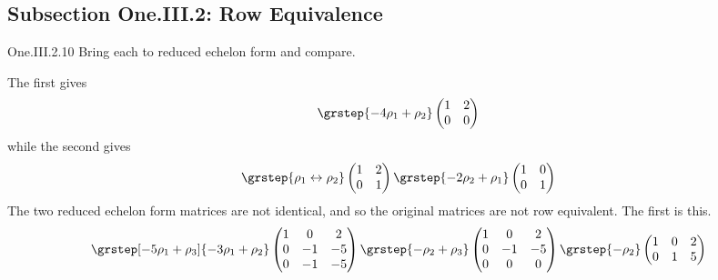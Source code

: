 \subsection{Subsection One.III.2: Row Equivalence}
\begin{ans}{One.III.2.10}
      Bring each to reduced echelon form and compare.
      \begin{exparts}
        \partsitem The first gives
          \begin{equation*}
            \grstep{-4\rho_1+\rho_2}
            \begin{pmatrix}
              1  &2  \\
              0  &0
            \end{pmatrix}
          \end{equation*}
          while the second gives
          \begin{equation*}
            \grstep{\rho_1\leftrightarrow\rho_2}
            \begin{pmatrix}
              1  &2  \\
              0  &1
            \end{pmatrix}
            \grstep{-2\rho_2+\rho_1}
            \begin{pmatrix}
              1  &0  \\
              0  &1
            \end{pmatrix}
          \end{equation*}
          The two reduced echelon form matrices are not identical, and so the
          original matrices are not row equivalent.
        \partsitem The first is this.
          \begin{equation*}
            \grstep[-5\rho_1+\rho_3]{-3\rho_1+\rho_2}
            \begin{pmatrix}
              1  &0  &2  \\
              0  &-1 &-5 \\
              0  &-1 &-5
            \end{pmatrix}
            \grstep{-\rho_2+\rho_3}
            \begin{pmatrix}
              1  &0  &2  \\
              0  &-1 &-5 \\
              0  &0  &0
            \end{pmatrix}
            \grstep{-\rho_2}
            \begin{pmatrix}
              1  &0  &2  \\
              0  &1  &5  \\

\end{pmatrix}
\end{equation*}
\end{exparts}
\end{ans}
